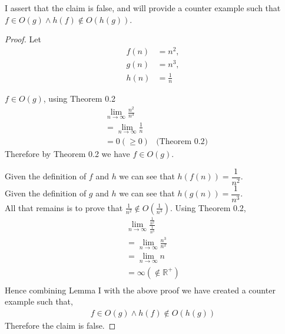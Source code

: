 \documentclass[12pt]{article}
\newcommand{\R}{\mathbb{R}}
\newenvironment{lemma}[2][Lemma]{\begin{trivlist}
\item[\hskip \labelsep {\bfseries #1}\hskip \labelsep {\bfseries #2.}]}{\end{trivlist}}
\newenvironment{question}[2][Question]{\begin{trivlist}
\item[\hskip \labelsep {\bfseries #1}\hskip \labelsep {\bfseries #2.}]}{\end{trivlist}}
\begin{document}
\begin{question}{3}
  I assert that the claim is false, and will provide a counter example such
  that $f \in O(g) \land h(f) \notin O(h(g))$.
  \begin{proof}
    Let
    \begin{align*}
      f(n) &= n^{2},\\
      g(n) &= n^{3},\\
      h(n) &= \frac{1}{n}
    \end{align*}

    \begin{lemma}{I} $f \in O(g)$, using Theorem 0.2
      \begin{align*}
        & \lim_{n\to\infty} \frac{n^{2}}{n^{3}} &  \\
        & = \lim_{n\to\infty} \frac{1}{n}       & \\
        & = 0 (\geq 0)                            & \text{(Theorem 0.2)}
      \end{align*}
      Therefore by Theorem 0.2 we have $f \in O(g)$.
    \end{lemma}

    Given the definition of $f$ and $h$ we can see that $h(f(n)) = \dfrac{1}{n^{2}}$.\\
    Given the definition of $g$ and $h$ we can see that $h(g(n)) = \dfrac{1}{n^{3}}$.\\
    All that remains is to prove that $\frac{1}{n^{2}}\notin O(\frac{1}{n^{3}})$.  Using Theorem 0.2,
    \begin{align*}
    & \lim_{n\to\infty} \frac{\frac{1}{n^{2}}}{\frac{1}{n^{3}}} &\\
        & = \lim_{n\to\infty} \frac{n^3}{n^2} &\\
        & = \lim_{n\to\infty} n &\\
        & = \infty (\notin \R^{+}) &\\
    \end{align*}
    Hence combining Lemma I with the above proof we have created a counter example
    such that,
    \begin{align*}
      f \in O(g) \land h(f) \notin O(h(g))
    \end{align*}
    Therefore the claim is false.
  \end{proof}
\end{question}
\end{document}
